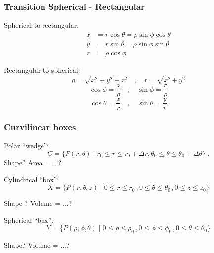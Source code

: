 \begin{frame}
 \frametitle{Transition Spherical - Rectangular}

\pause
Spherical to rectangular:\pause
\begin{align*}
 x & = r\cos\theta = \rho\sin\phi \cos\theta \\
  y & = r\sin\theta = \rho\sin\phi \sin\theta \\
  z & = \rho\cos\phi
\end{align*}

\pause
Rectangular to spherical:\pause
$$\rho = \sqrt{x^2+y^2+z^2} \quad , \quad r = \sqrt{x^2+y^2}$$
$$\cos\phi = \frac{z}{\rho} \quad , \quad \sin\phi = \frac{r}{\rho}$$
$$\cos\theta = \frac{x}{r} \quad , \quad \sin\theta = \frac{y}{r}$$

\end{frame}

\begin{frame}
 \frametitle{Curvilinear boxes}
 
 Polar ``wedge'':
$$C  = \{ P(r,\theta) \; | \;r_0 \leqslant
r \leqslant r_0+\Delta r,  \theta_0 \leqslant \theta
\leqslant \theta_0+\Delta \theta\} \; .$$
%
Shape? \pause Area = ...?
\pause

\bigskip

Cylindrical ``box'':
%
$$X = \{ P(r,\theta, z) \; | \; 0 \leqslant r \leqslant r_0\, ,
0 \leqslant \theta \leqslant \theta_0\, ,
0 \leqslant z \leqslant z_0\}$$

\pause
Shape ? \pause Volume = ...?

\bigskip

\pause
Spherical ``box'':
%
$$Y = \{ P(\rho, \phi, \theta) \; | \; 0 \leqslant \rho \leqslant \rho_0\, ,
0 \leqslant \phi \leqslant \phi_0\, ,
0 \leqslant \theta \leqslant \theta_0\}$$

\pause
Shape? \pause Volume = ...?

\end{frame}